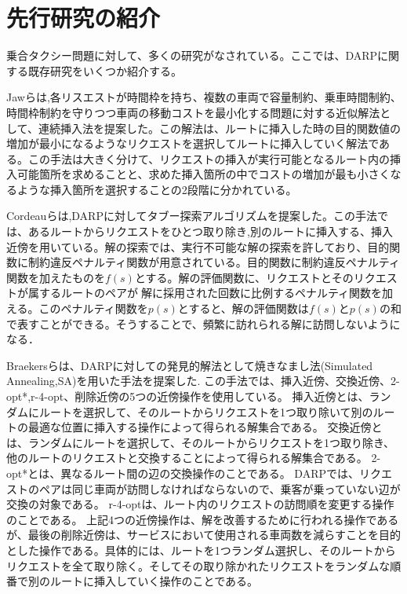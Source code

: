 \chapter{先行研究の紹介}\label{previous_research}
乗合タクシー問題に対して、多くの研究がなされている。ここでは、DARPに関する既存研究をいくつか紹介する。

Jawらは,各リスエストが時間枠を持ち、複数の車両で容量制約、乗車時間制約、時間枠制約を守りつつ車両の移動コストを最小化する問題に対する近似解法として、連続挿入法を提案した\cite{insertion}。この解法は、ルートに挿入した時の目的関数値の増加が最小になるようなリクエストを選択してルートに挿入していく解法である。この手法は大きく分けて、リクエストの挿入が実行可能となるルート内の挿入可能箇所を求めることと、求めた挿入箇所の中でコストの増加が最も小さくなるような挿入箇所を選択することの2段階に分かれている。

Cordeauらは,DARPに対してタブー探索アルゴリズムを提案した\cite{tabu}。この手法では、あるルートからリクエストをひとつ取り除き,別のルートに挿入する、挿入近傍を用いている。解の探索では、実行不可能な解の探索を許しており、目的関数に制約違反ペナルティ関数が用意されている。目的関数に制約違反ペナルティ関数を加えたものを$f(s)$とする。解の評価関数に、リクエストとそのリクエストが属するルートのペアが解に採用された回数に比例するペナルティ関数を加える。このペナルティ関数を$p(s)$とすると、解の評価関数は$f(s)とp(s)$の和で表すことができる。そうすることで、頻繁に訪れられる解に訪問しないようになる．

Braekersらは、DARPに対しての発見的解法として焼きなまし法(Simulated Annealing,SA)を用いた手法を提案した\cite{SA}. この手法では、挿入近傍、交換近傍、2-opt*,r-4-opt、削除近傍の5つの近傍操作を使用している。
挿入近傍とは、ランダムにルートを選択して、そのルートからリクエストを1つ取り除いて別のルートの最適な位置に挿入する操作によって得られる解集合である。
交換近傍とは、ランダムにルートを選択して、そのルートからリクエストを1つ取り除き、他のルートのリクエストと交換することによって得られる解集合である。
2-opt*とは、異なるルート間の辺の交換操作のことである。 DARPでは、リクエストのペアは同じ車両が訪問しなければならないので、乗客が乗っていない辺が交換の対象である。
r-4-optは、ルート内のリクエストの訪問順を変更する操作のことである。
上記4つの近傍操作は、解を改善するために行われる操作であるが、最後の削除近傍は、サービスにおいて使用される車両数を減らすことを目的とした操作である。具体的には、ルートを1つランダム選択し、そのルートからリクエストを全て取り除く。そしてその取り除かれたリクエストをランダムな順番で別のルートに挿入していく操作のことである。

